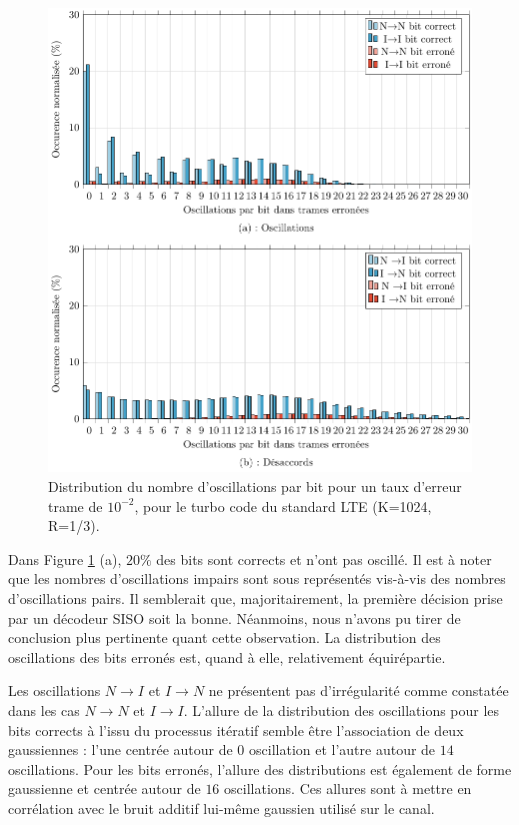 
\begin{figure}[!t]
	\centering
	\includegraphics[width=.8\textwidth]{main/ch2_fig/tikz/d_lte_10-2.pdf}
	\caption{Distribution du nombre d'oscillations par bit pour un taux d'erreur trame de $10^{-2}$, pour le turbo code du standard LTE (K=1024, R=1/3). \label{fig:d_lte_10-2}}
\end{figure}

Dans Figure \ref{fig:d_lte_10-2} (a), $20\%$ des bits sont corrects et n'ont pas oscillé. Il est à noter que 
les nombres d'oscillations impairs sont sous représentés vis-à-vis des nombres d'oscillations pairs. Il semblerait que, 
majoritairement, la première décision prise par un décodeur SISO soit la bonne. Néanmoins, nous n'avons pu tirer de
conclusion plus pertinente quant 
cette observation. La distribution des oscillations des bits erronés est, quand à elle, relativement équirépartie. 

Les oscillations $N\rightarrow I$ et $I\rightarrow N$ ne présentent pas d’irrégularité comme constatée dans les cas 
$N\rightarrow N$ et $I\rightarrow I$. L'allure de la distribution des oscillations pour les bits corrects à l'issu du 
processus itératif semble être l'association de deux gaussiennes : l'une centrée autour de $0$ oscillation et l'autre 
autour de $14$ oscillations. Pour les 
bits erronés, l'allure des distributions est également de forme gaussienne et centrée autour de $16$ oscillations. Ces 
allures sont à
mettre en corrélation avec le bruit additif lui-même gaussien utilisé sur le canal.

